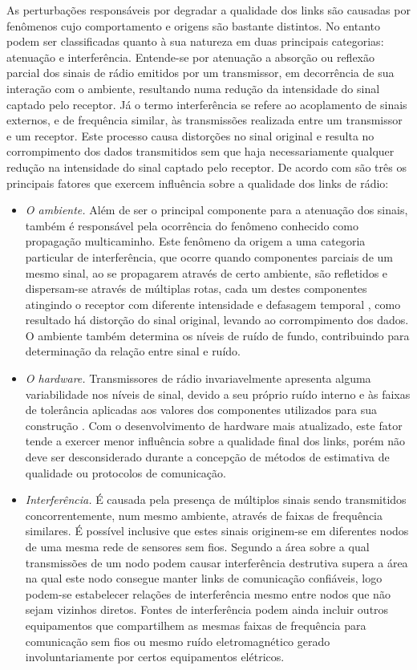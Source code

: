 \documentclass[
	12pt,				%
	openright,			%
	oneside,
	a4paper,			%
	english,			%
	french,				%
	spanish,			%
	brazil				%
	]{abntex2}
\begin{document}
As perturbações responsáveis por degradar a qualidade dos links são causadas por fenômenos cujo comportamento e origens são bastante distintos. No entanto podem ser classificadas quanto à sua natureza em duas principais categorias: atenuação e interferência. Entende-se por atenuação a absorção ou reflexão parcial dos sinais de rádio emitidos por um transmissor, em decorrência de sua interação com o ambiente, resultando numa redução da intensidade do sinal captado pelo receptor. Já o termo interferência se refere ao acoplamento de sinais externos, e de frequência similar, às transmissões realizada entre um transmissor e um receptor. Este processo causa distorções no sinal original e resulta no corrompimento dos dados transmitidos sem que haja necessariamente qualquer redução na intensidade do sinal captado pelo receptor. De acordo com \cite{Baccour2012} são três os principais fatores que exercem influência sobre a qualidade dos links de rádio:
\begin{itemize}
	\item \textit{O ambiente.} Além de ser o principal componente para a atenuação dos sinais, também é responsável pela ocorrência do fenômeno conhecido como propagação multicaminho. Este fenômeno da origem a uma categoria particular de interferência, que ocorre quando componentes parciais de um mesmo sinal, ao se propagarem através de certo ambiente, são refletidos e dispersam-se através de múltiplas rotas, cada um destes componentes atingindo o receptor com diferente intensidade e defasagem temporal \cite{Kusy2011}, como resultado há distorção do sinal original, levando ao corrompimento dos dados. O ambiente também determina os níveis de ruído de fundo, contribuindo para determinação da relação entre sinal e ruído.
	\item \textit{O hardware.} Transmissores de rádio invariavelmente apresenta alguma variabilidade nos níveis de sinal, devido a seu próprio ruído interno e às faixas de tolerância aplicadas aos valores dos componentes utilizados para sua construção \cite{Goldsmith2005}. Com o desenvolvimento de hardware mais atualizado, este fator tende a exercer menor influência sobre a qualidade final dos links, porém não deve ser desconsiderado durante a concepção de métodos de estimativa de qualidade ou protocolos de comunicação. 
	\item \textit{Interferência.} É causada pela presença de múltiplos sinais sendo transmitidos concorrentemente, num mesmo ambiente, através de faixas de frequência similares. É possível inclusive que estes sinais originem-se em diferentes nodos de uma mesma rede de sensores sem fios. Segundo \cite{Baccour2012} a área sobre a qual transmissões de um nodo podem causar interferência destrutiva supera a área na qual este nodo consegue manter links de comunicação confiáveis, logo podem-se estabelecer relações de interferência mesmo entre nodos que não sejam vizinhos diretos. Fontes de interferência podem ainda incluir outros equipamentos que compartilhem as mesmas faixas de frequência para comunicação sem fios ou mesmo ruído eletromagnético gerado involuntariamente por certos equipamentos elétricos.
\end{itemize}
\end{document}
